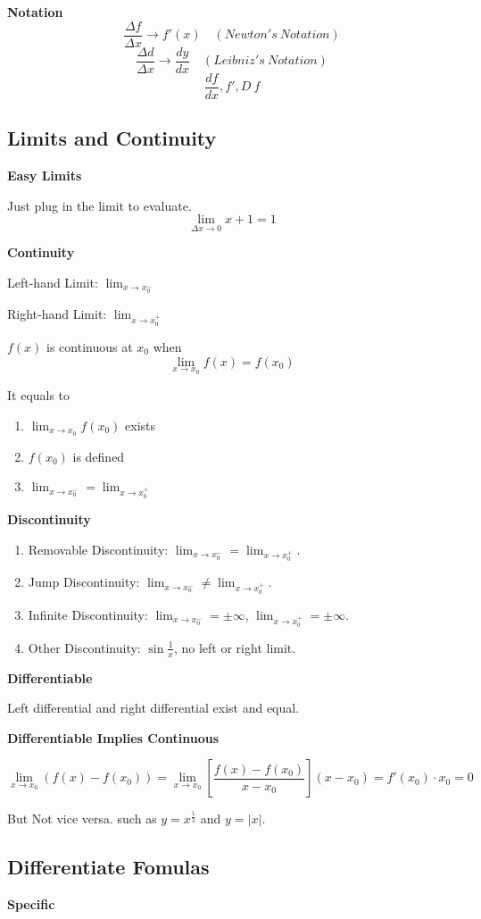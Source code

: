 \documentclass{article}
\newcommand\limitx[1]{\lim_{x \to #1}}
\newcommand\limitdeltaxzero{\lim_{\Delta x \to 0}}
\begin{document}
\textbf{Notation}
$$\frac{\Delta f}{\Delta x} \rightarrow f'(x) \quad (Newton's \  Notation)$$
$$\frac{\Delta d}{\Delta x} \rightarrow \frac{dy}{dx} \quad (Leibniz's \  Notation)$$
$$\frac{df}{dx}, f', D\ f$$

\subsection{Limits and Continuity}

\textbf{Easy Limits}

Just plug in the limit to evaluate.
$$\limitdeltaxzero x + 1 = 1$$

\textbf{Continuity}

Left-hand Limit: $\limitx{x_0^-}$

Right-hand Limit: $\limitx{x_0^+}$

$f(x)$ is continuous at $x_0$ when
$$\limitx{x_0} f(x) = f(x_0)$$

It equals to
\begin{enumerate}
\item $\limitx{x_0}f(x_0)$ exists
\item $f(x_0)$ is defined
\item $\limitx{x_0^-} = \limitx{x_0^+}$
\end{enumerate}

\textbf{Discontinuity}

\begin{enumerate}
\item Removable Discontinuity: $\limitx{x_0^-} = \limitx{x_0^+}$.
\item Jump Discontinuity: $\limitx{x_0^-} \not= \limitx{x_0^+}$.
\item Infinite Discontinuity: $\limitx{x_0^-} = \pm\infty$, $\limitx{x_0^+} = \pm\infty$.
\item Other Discontinuity: $\sin{\frac{1}{x}}$, no left or right limit.
\end{enumerate}

\textbf{Differentiable}

Left differential and right differential exist and equal.

\textbf{Differentiable Implies Continuous}

$$\limitx{x_0}{(f(x)-f(x_0))} = \limitx{x_0}\left[{\frac{f(x)-f(x_0)}{x-x_0}}\right](x-x_0) = f'(x_0) \cdot x_0 = 0$$

But Not vice versa.
such as $y = x^{\frac{1}{3}}$ and $y = \left|x\right|$.

\subsection{Differentiate Fomulas}
\textbf{Specific}
\end{document}
